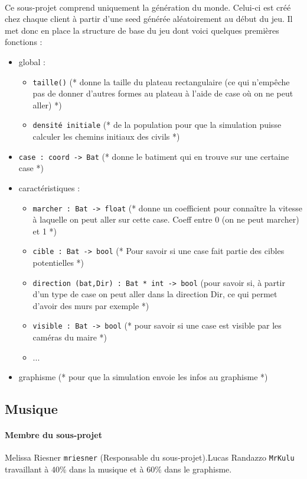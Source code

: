 \documentclass[a4paper,10pt]{article}
\begin{document}
\paragraph{} Ce sous-projet comprend uniquement la génération du monde. Celui-ci est créé chez chaque client à partir d'une seed générée aléatoirement au début du jeu. Il met donc en place la structure de base du jeu dont voici quelques premières fonctions :
\begin{itemize}
\item global : \begin{itemize}
	\item \verb!taille()! (* donne la taille du plateau rectangulaire (ce qui n'empêche pas de donner d'autres formes au plateau à l'aide de case où on ne peut aller) *)
	\item \verb!densité initiale! (* de la population pour que la simulation puisse calculer les chemins initiaux des civils *)
	\end{itemize}
\item \verb!case : coord -> Bat! (* donne le batiment qui en trouve sur une certaine case *)
\item caractéristiques : \begin{itemize}
	\item \verb!marcher : Bat -> float! (* donne un coefficient pour connaître la vitesse à laquelle on peut aller sur cette case. Coeff entre 0 (on ne peut marcher) et 1 *)
	\item \verb!cible : Bat -> bool! (* Pour savoir si une case fait partie des cibles potentielles *)
	\item \verb!direction (bat,Dir) : Bat * int -> bool! (pour savoir si, à partir d'un type de case on peut aller dans la direction Dir, ce qui permet d'avoir des murs par exemple *)
	\item \verb!visible : Bat -> bool! (* pour savoir si une case est visible par les caméras du maire *)
	\item ...
	\end{itemize}
\item graphisme (* pour que la simulation envoie les infos au graphisme *)
\end{itemize}
\subsection{Musique} 
\paragraph{Membre du sous-projet} Melissa Riesner \verb!mriesner! (Responsable du sous-projet).Lucas Randazzo \verb!MrKulu! travaillant à $40\%$ dans la musique et à $60\%$ dans le graphisme. 
\end{document}
